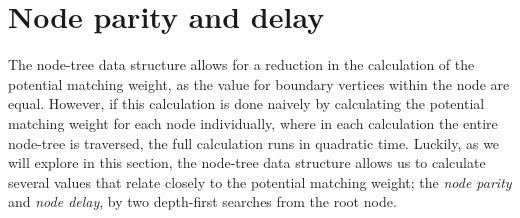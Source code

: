 


\section{Node parity and delay}\label{sec:nodedelay}
The node-tree data structure allows for a reduction in the calculation of the potential matching weight, as the value for boundary vertices within the node are equal. However, if this calculation is done naively by calculating the potential matching weight for each node individually, where in each calculation the entire node-tree is traversed, the full calculation runs in quadratic time. Luckily, as we will explore in this section, the node-tree data structure allows us to calculate several values that relate closely to the potential matching weight; the \emph{node parity} and \emph{node delay}, by two depth-first searches from the root node. 

